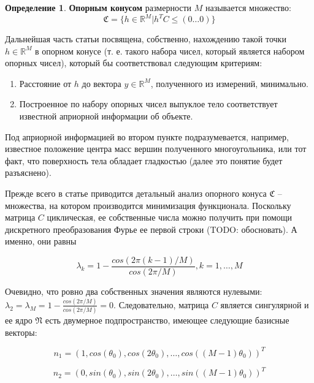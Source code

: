\documentclass[a4paper, 12pt, titlepage]{article}
\theoremstyle{definition}
\newtheorem{SmartDefinition}{Определение}
\theoremstyle{plain}
\begin{document}
\begin{SmartDefinition}
 \label{def:support-cone}
 \textbf{Опорным конусом} размерности $M$ называется множество:
 \begin{equation}
 \mathfrak{C} = \{h \in \mathbb{R}^{M} | h^{T} C \leq (0 \ldots 0) \}
 \end{equation}
\end{SmartDefinition}

Дальнейшая часть статьи посвящена, собственно, нахождению такой точки 
$h \in \mathbb{R}^{M}$ в
опорном конусе (т. е. такого набора чисел, который является набором опорных
чисел), который бы соответствовал следующим критериям:

\begin{enumerate}
 \item Расстояние от $h$ до вектора $y \in \mathbb{R}^{M}$, полученного из
измерений, минимально.
 \item Построенное по набору опорных чисел выпуклое тело соответствует
известной априорной информации об объекте.
\end{enumerate}

Под априорной информацией во втором пункте подразумевается, например, известное
положение центра масс вершин полученного многоугольника, или тот факт, что
поверхность тела обладает гладкостью (далее это понятие будет разъяснено).

Прежде всего в статье приводится детальный анализ опорного конуса $\mathfrak{C}$
-- множества, на котором производится минимизация функционала. Поскольку матрица
$C$ циклическая, ее собственные числа можно получить при помощи дискретного
преобразования Фурье ее первой строки (TODO: обосновать). А именно, они равны

\begin{equation}
\lambda_{k} = 1 - \frac{cos(2 \pi (k - 1) / M)}{cos(2 \pi / M)},
k = 1, \ldots, M
\end{equation}

Очевидно, что ровно два собственных значения являются нулевыми:
$\lambda_{2} = \lambda_{M} = 1 - \frac{cos(2 \pi / M)}{cos(2 \pi / M)} = 0$.
Следовательно, матрица $C$ является сингулярной и ее ядро $\mathfrak{N}$ есть
двумерное подпространство, имеющее следующие базисные векторы:

\begin{equation}
n_{1} = (1, cos(\theta_{0}), cos(2 \theta_{0}), \ldots,
cos((M - 1) \theta_{0}))^{T}
\end{equation}

\begin{equation}
n_{2} = (0, sin(\theta_{0}), sin(2 \theta_{0}), \ldots,
sin((M - 1) \theta_{0}))^{T}
\end{equation}
\end{document}
